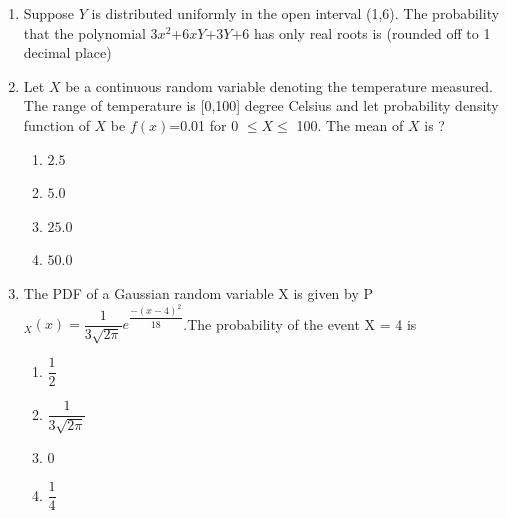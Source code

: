 \begin{enumerate}[label=\thesection.\arabic*.,ref=\thesection.\theenumi]
%
\item Suppose $Y$ is distributed uniformly in the open interval (1,6). The probability that the polynomial 3$x^2$+6$xY$+3$Y$+6 has only real roots is (rounded off to 1 decimal place) 
%
\solution
 

%
\item Let \(X\) be a continuous random variable denoting the temperature measured. The range of temperature is [0,100] degree Celsius and let probability density function of \(X\) be \(f(x)\)=0.01 for 0 \(\leq X \leq\) 100.\newline
The mean of \(X\) is ?\newline
%
\begin{enumerate}[label=(\Alph*)]
    \item \(2.5\)
    \item \(5.0\)
    \item \(25.0\)
    \item \(50.0\)
\end{enumerate}
%
\solution


%
\item The PDF of a Gaussian random variable X is given by 
P$_{X}(x) = \dfrac{1}{3\sqrt{2\pi}}e^{\dfrac{-(x-4)^{2}}{18}}$.The probability of the event { X = 4} is\\
\begin{enumerate}
    \item  $\dfrac{1}{2}$\\
    \item  $\dfrac{1}{3\sqrt{2\pi}}$\\
    \item  0\\
    \item  $\dfrac{1}{4}$\\
\end{enumerate}
%
\solution

%


\end{enumerate}
